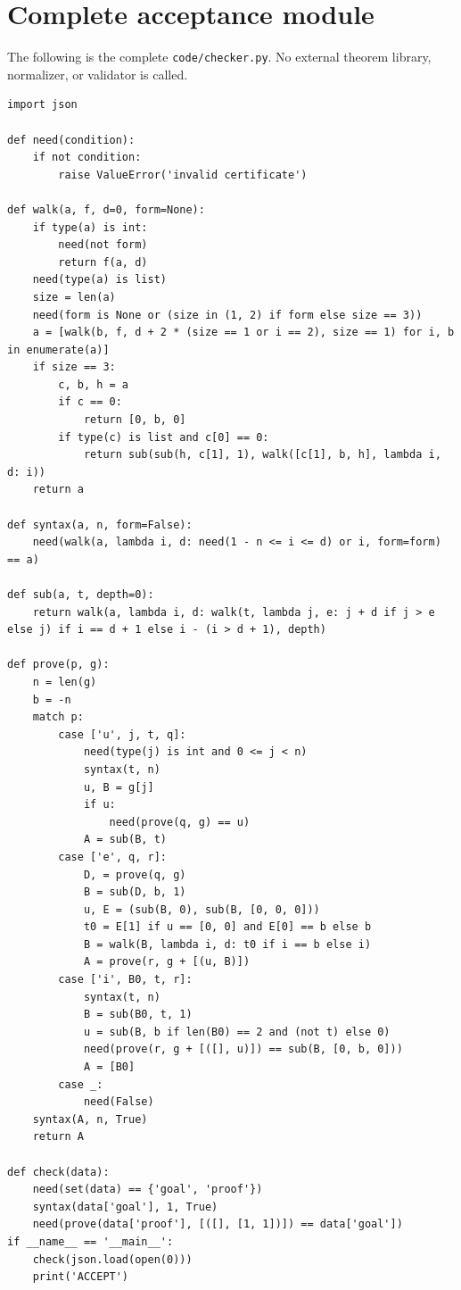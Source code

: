 \documentclass[11pt]{article}
\theoremstyle{definition}
\theoremstyle{remark}
\begin{document}
\appendix
\section{Complete acceptance module}

The following is the complete
\texttt{code/checker.py}. No external
theorem library, normalizer, or
validator is called.

\begin{lstlisting}
import json

def need(condition):
    if not condition:
        raise ValueError('invalid certificate')

def walk(a, f, d=0, form=None):
    if type(a) is int:
        need(not form)
        return f(a, d)
    need(type(a) is list)
    size = len(a)
    need(form is None or (size in (1, 2) if form else size == 3))
    a = [walk(b, f, d + 2 * (size == 1 or i == 2), size == 1) for i, b in enumerate(a)]
    if size == 3:
        c, b, h = a
        if c == 0:
            return [0, b, 0]
        if type(c) is list and c[0] == 0:
            return sub(sub(h, c[1], 1), walk([c[1], b, h], lambda i, d: i))
    return a

def syntax(a, n, form=False):
    need(walk(a, lambda i, d: need(1 - n <= i <= d) or i, form=form) == a)

def sub(a, t, depth=0):
    return walk(a, lambda i, d: walk(t, lambda j, e: j + d if j > e else j) if i == d + 1 else i - (i > d + 1), depth)

def prove(p, g):
    n = len(g)
    b = -n
    match p:
        case ['u', j, t, q]:
            need(type(j) is int and 0 <= j < n)
            syntax(t, n)
            u, B = g[j]
            if u:
                need(prove(q, g) == u)
            A = sub(B, t)
        case ['e', q, r]:
            D, = prove(q, g)
            B = sub(D, b, 1)
            u, E = (sub(B, 0), sub(B, [0, 0, 0]))
            t0 = E[1] if u == [0, 0] and E[0] == b else b
            B = walk(B, lambda i, d: t0 if i == b else i)
            A = prove(r, g + [(u, B)])
        case ['i', B0, t, r]:
            syntax(t, n)
            B = sub(B0, t, 1)
            u = sub(B, b if len(B0) == 2 and (not t) else 0)
            need(prove(r, g + [([], u)]) == sub(B, [0, b, 0]))
            A = [B0]
        case _:
            need(False)
    syntax(A, n, True)
    return A

def check(data):
    need(set(data) == {'goal', 'proof'})
    syntax(data['goal'], 1, True)
    need(prove(data['proof'], [([], [1, 1])]) == data['goal'])
if __name__ == '__main__':
    check(json.load(open(0)))
    print('ACCEPT')
\end{lstlisting}
\end{document}
